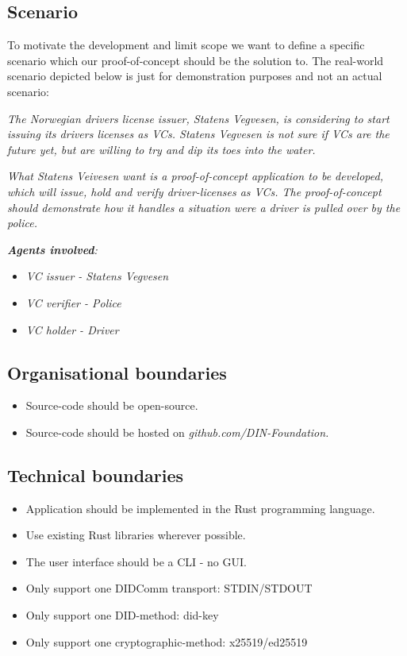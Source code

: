 \hypertarget{scenario}{%
\subsection{Scenario}\label{scenario}}

To motivate the development and limit scope we want to define a specific
scenario which our proof-of-concept should be the solution to. The
real-world scenario depicted below is just for demonstration purposes
and not an actual scenario:

\emph{The Norwegian drivers license issuer, Statens Vegvesen, is
considering to start issuing its drivers licenses as VCs. Statens
Vegvesen is not sure if VCs are the future yet, but are willing to try
and dip its toes into the water.}

\emph{What Statens Veivesen want is a proof-of-concept application to be
developed, which will issue, hold and verify driver-licenses as VCs. The
proof-of-concept should demonstrate how it handles a situation were a
driver is pulled over by the police.}

\emph{\textbf{Agents involved}:}

\begin{itemize}
\tightlist
\item
  \emph{VC issuer - Statens Vegvesen}
\item
  \emph{VC verifier - Police}
\item
  \emph{VC holder - Driver}
\end{itemize}

\hypertarget{organisational-boundaries}{%
\subsection{Organisational boundaries}\label{organisational-boundaries}}

\begin{itemize}
\tightlist
\item
  Source-code should be open-source.
\item
  Source-code should be hosted on \emph{github.com/DIN-Foundation.}
\end{itemize}

\hypertarget{technical-boundaries}{%
\subsection{Technical boundaries}\label{technical-boundaries}}

\begin{itemize}
\tightlist
\item
  Application should be implemented in the Rust programming language.
\item
  Use existing Rust libraries wherever possible.
\item
  The user interface should be a CLI - no GUI.
\item
  Only support one DIDComm transport: STDIN/STDOUT
\item
  Only support one DID-method: did-key
\item
  Only support one cryptographic-method: x25519/ed25519
\end{itemize}

